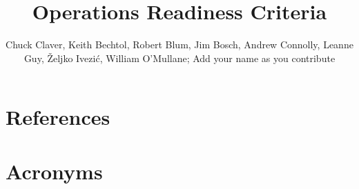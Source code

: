 \documentclass[SE,lsstdraft,authoryear,toc]{lsstdoc}
\title{Operations Readiness Criteria}
\author{%
Chuck Claver, 
Keith Bechtol, 
Robert Blum, 
Jim Bosch, 
Andrew Connolly, 
Leanne Guy,  
\v{Z}eljko Ivezi\'{c}, 
William O'Mullane; 
Add your name as you contribute
}
\date{\vcsDate}
\begin{document}
\maketitle














\appendix
\section{References} \label{sec:bib}
\renewcommand{\refname}{} %


\section{Acronyms} \label{sec:acronyms}

\end{document}

